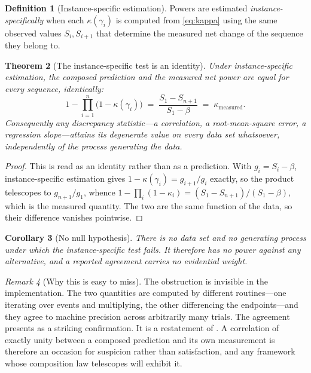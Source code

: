 \documentclass[11pt,twocolumn,a4paper]{article}
\theoremstyle{thmstyle}
\newtheorem{theorem}{Theorem}[section]
\newtheorem{corollary}[theorem]{Corollary}
\theoremstyle{definition}
\newtheorem{definition}[theorem]{Definition}
\theoremstyle{remark}
\newtheorem{remark}[theorem]{Remark}
\newcommand{\flo}{\beta}
\newcommand{\kap}{\kappa}
\begin{document}
\begin{definition}[Instance-specific estimation]
\label{def:instance}
Powers are estimated \emph{instance-specifically} when each $\kap(\gamma_i)$
is computed from \eqref{eq:kappa} using the same observed values
$S_i,S_{i+1}$ that determine the measured net change of the sequence they
belong to.
\end{definition}

\begin{theorem}[The instance-specific test is an identity]
\label{thm:telescoping}
Under instance-specific estimation, the composed prediction and the measured
net power are equal for every sequence, identically:
\[
1-\prod_{i=1}^{n}\bigl(1-\kap(\gamma_i)\bigr)
\;=\;\frac{S_1-S_{n+1}}{S_1-\flo}
\;=\;\kap_{\mathrm{measured}}.
\]
Consequently any discrepancy statistic---a correlation, a root-mean-square
error, a regression slope---attains its degenerate value on every data set
whatsoever, independently of the process generating the data.
\end{theorem}

\begin{proof}
This is  read as an identity rather than as a
prediction. With $g_i=S_i-\flo$, instance-specific estimation gives
$1-\kap(\gamma_i)=g_{i+1}/g_i$ exactly, so the product telescopes to
$g_{n+1}/g_1$, whence
$1-\prod_i(1-\kap_i)=(S_1-S_{n+1})/(S_1-\flo)$, which is the measured
quantity. The two are the same function of the data, so their difference
vanishes pointwise.
\end{proof}

\begin{corollary}[No null hypothesis]
\label{cor:no-null}
There is no data set and no generating process under which the
instance-specific test fails. It therefore has no power against any
alternative, and a reported agreement carries no evidential weight.
\end{corollary}

\begin{remark}[Why this is easy to miss]
\label{rem:easy-to-miss}
The obstruction is invisible in the implementation. The two quantities are
computed by different routines---one iterating over events and multiplying,
the other differencing the endpoints---and they agree to machine precision
across arbitrarily many trials. The agreement presents as a striking
confirmation. It is a restatement of . A correlation of
exactly unity between a composed prediction and its own measurement is
therefore an occasion for suspicion rather than satisfaction, and any
framework whose composition law telescopes will exhibit it.
\end{remark}
\end{document}
